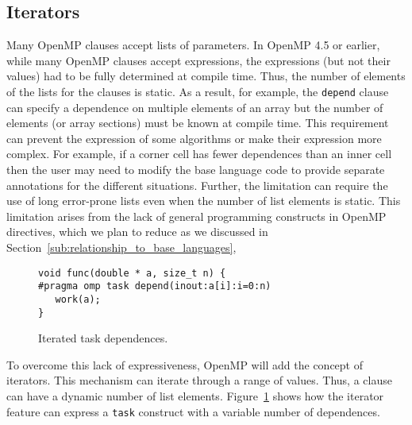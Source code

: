 \subsection{Iterators}
\label{sub:iterators}

Many OpenMP clauses accept lists of parameters. In OpenMP 4.5 or earlier, 
while many OpenMP clauses accept expressions, the expressions (but not 
their values) had to be fully determined at compile time. Thus, the number 
of elements of the lists for the clauses is static. As a result, for example,
the \texttt{depend} clause can specify a dependence on multiple elements
of an array but the number of elements (or array sections) must be known
at compile time. This requirement can prevent the expression of some
algorithms or make their expression more complex.  For example, if a 
corner cell has fewer dependences than an inner cell then the user may need 
to modify the base language code to provide separate annotations for the
different situations. Further, the limitation can require the use of long 
error-prone lists even when the number of list elements is static. This 
limitation arises from the lack of general programming constructs in 
OpenMP directives, which we plan to reduce as we discussed in 
Section~\ref{sub:relationship_to_base_languages}, 

\begin{figure}
\begin{verbatim}
void func(double * a, size_t n) {
#pragma omp task depend(inout:a[i]:i=0:n)
   work(a);
}
\end{verbatim}
\caption{Iterated task dependences.\label{fig:iterators}}
\end{figure}

To overcome this lack of expressiveness, OpenMP will add the concept of  
iterators. This mechanism can iterate through a range of values. Thus, a
clause can have a dynamic number of list elements. Figure~\ref{fig:iterators} 
shows how the iterator feature can express a \texttt{task} construct with a 
variable number of dependences.
